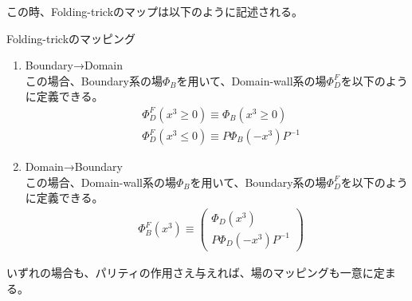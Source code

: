 \documentclass[dvipdfmx,a4paper,10.5pt]{article}
\numberwithin{equation}{section}
\begin{document}
この時、Folding-trickのマップは以下のように記述される。\\
\begin{resultbox}{Folding-trickのマッピング}
    \begin{enumerate}
    \item Boundary→Domain\\
    この場合、Boundary系の場$\Phi_{B}$を用いて、Domain-wall系の場$\Phi_{D}^{F}$を以下のように定義できる。
    \begin{align*}
        &\Phi_{D}^{F}(x^{3}\geq 0)\equiv \Phi_{B}(x^{3}\geq 0)\\
        &\Phi_{D}^{F}(x^{3}\leq 0)\equiv P\Phi_{B}(-x^{3})P^{-1}
    \end{align*}
    \item Domain→Boundary\\
   この場合、Domain-wall系の場$\Phi_{B}$を用いて、Boundary系の場$\Phi_{D}^{F}$を以下のように定義できる。
    \begin{align*}
        &\Phi_{B}^{F}(x^{3})\equiv \begin{pmatrix}
        \Phi_{D}(x^{3})\\ P\Phi_{D}(-x^{3})P^{-1}
    \end{pmatrix}
    \end{align*}
\end{enumerate}
\end{resultbox}
いずれの場合も、パリティの作用さえ与えれば、場のマッピングも一意に定まる。
\end{document}

